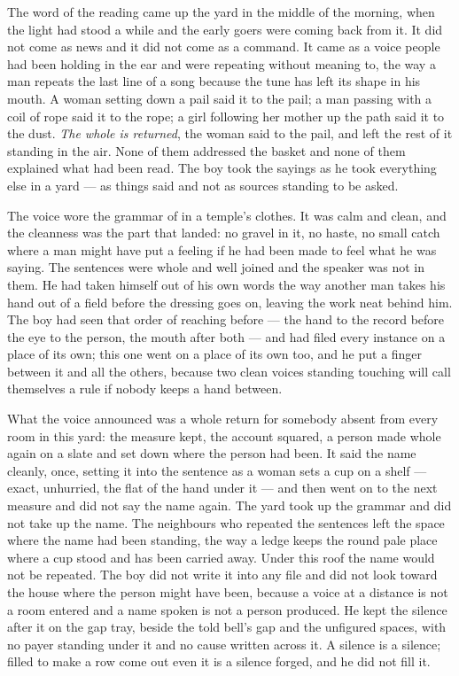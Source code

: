 The word of the reading came up the yard in the middle of the morning, when the light had stood a while and the early goers were coming back from it. It did not come as news and it did not come as a command. It came as a voice people had been holding in the ear and were repeating without meaning to, the way a man repeats the last line of a song because the tune has left its shape in his mouth. A woman setting down a pail said it to the pail; a man passing with a coil of rope said it to the rope; a girl following her mother up the path said it to the dust. \emph{The whole is returned}, the woman said to the pail, and left the rest of it standing in the air. None of them addressed the basket and none of them explained what had been read. The boy took the sayings as he took everything else in a yard --- as things said and not as sources standing to be asked.

The voice wore the grammar of  in a temple's clothes. It was calm and clean, and the cleanness was the part that landed: no gravel in it, no haste, no small catch where a man might have put a feeling if he had been made to feel what he was saying. The sentences were whole and well joined and the speaker was not in them. He had taken himself out of his own words the way another man takes his hand out of a field before the dressing goes on, leaving the work neat behind him. The boy had seen that order of reaching before --- the hand to the record before the eye to the person, the mouth after both --- and had filed every instance on a place of its own; this one went on a place of its own too, and he put a finger between it and all the others, because two clean voices standing touching will call themselves a rule if nobody keeps a hand between.

What the voice announced was a whole return for somebody absent from every room in this yard: the measure kept, the account squared, a person made whole again on a slate and set down where the person had been. It said the name cleanly, once, setting it into the sentence as a woman sets a cup on a shelf --- exact, unhurried, the flat of the hand under it --- and then went on to the next measure and did not say the name again. The yard took up the grammar and did not take up the name. The neighbours who repeated the sentences left the space where the name had been standing, the way a ledge keeps the round pale place where a cup stood and has been carried away. Under this roof the name would not be repeated. The boy did not write it into any file and did not look toward the house where the person might have been, because a voice at a distance is not a room entered and a name spoken is not a person produced. He kept the silence after it on the gap tray, beside the told bell's gap and the unfigured spaces, with no payer standing under it and no cause written across it. A silence is a silence; filled to make a row come out even it is a silence forged, and he did not fill it.

